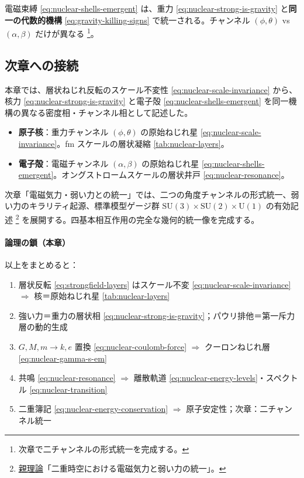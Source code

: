 \documentclass[dvipdfmx,a4paper,oneside]{jsbook}
\numberwithin{equation}{chapter}
\begin{document}
電磁束縛 \eqref{eq:nuclear-shells-emergent} は、重力 \eqref{eq:nuclear-strong-is-gravity} と\textbf{同一の代数的機構} \eqref{eq:gravity-killing-signs} で統一される。チャンネル \((\phi,\theta)\) vs \((\alpha,\beta)\) だけが異なる \footnote{次章で二チャンネルの形式統一を完成する。}。

\subsection{次章への接続}

本章では、層状ねじれ反転のスケール不変性 \eqref{eq:nuclear-scale-invariance} から、核力 \eqref{eq:nuclear-strong-is-gravity} と電子殻 \eqref{eq:nuclear-shells-emergent} を同一機構の異なる密度相・チャンネル相として記述した。

\begin{itemize}[leftmargin=2em]
  \item \textbf{原子核}：重力チャンネル \((\phi, \theta)\) の原始ねじれ星 \eqref{eq:nuclear-scale-invariance}。fm スケールの層状凝縮 \eqref{tab:nuclear-layers}。
  \item \textbf{電子殻}：電磁チャンネル \((\alpha, \beta)\) の原始ねじれ星 \eqref{eq:nuclear-shells-emergent}。オングストロームスケールの層状井戸 \eqref{eq:nuclear-resonance}。
\end{itemize}

次章「電磁気力・弱い力との統一」では、二つの角度チャンネルの形式統一、弱い力のキラリティ起源、標準模型ゲージ群 \(\mathrm{SU}(3)\times\mathrm{SU}(2)\times\mathrm{U}(1)\) の有効記述 \footnote{\hyperref[sec:sister-manuscripts]{親理論}「二重時空における電磁気力と弱い力の統一」。} を展開する。四基本相互作用の完全な幾何的統一像を完成する。

\paragraph{論理の鎖（本章）}
以上をまとめると：
\begin{enumerate}[leftmargin=2em]
  \item 層状反転 \eqref{eq:strongfield-layers} はスケール不変 \eqref{eq:nuclear-scale-invariance} \(\Rightarrow\) 核＝原始ねじれ星 \eqref{tab:nuclear-layers}
  \item 強い力＝重力の層状相 \eqref{eq:nuclear-strong-is-gravity}；パウリ排他＝第一斥力層の動的生成
  \item \(G,M,m \to k,e\) 置換 \eqref{eq:nuclear-coulomb-force} \(\Rightarrow\) クーロンねじれ層 \eqref{eq:nuclear-gamma-s-em}
  \item 共鳴 \eqref{eq:nuclear-resonance} \(\Rightarrow\) 離散軌道 \eqref{eq:nuclear-energy-levels}・スペクトル \eqref{eq:nuclear-transition}
  \item 二重簿記 \eqref{eq:nuclear-energy-conservation} \(\Rightarrow\) 原子安定性；次章：二チャンネル統一
\end{enumerate}
\end{document}
